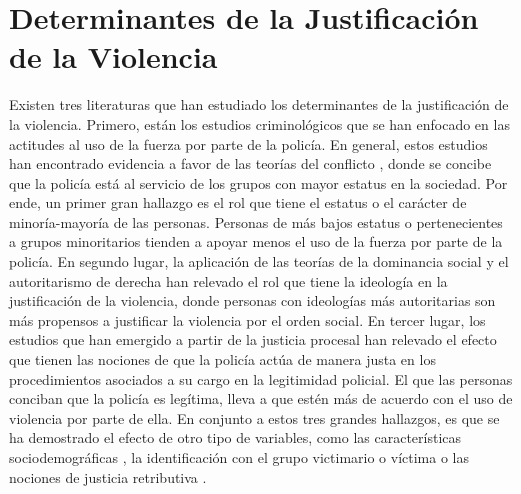 \documentclass[12pt,twoside]{templates/facsothesis}
\begin{document}
\hypertarget{determinantes-de-la-justificaciuxf3n-de-la-violencia}{%
\section{Determinantes de la Justificación de la Violencia}\label{determinantes-de-la-justificaciuxf3n-de-la-violencia}}

Existen tres literaturas que han estudiado los determinantes de la justificación de la violencia. Primero, están los estudios criminológicos que se han enfocado en las actitudes al uso de la fuerza por parte de la policía. En general, estos estudios han encontrado evidencia a favor de las teorías del conflicto \citep{Chambliss1995, Quinney1971, Turk1969}, donde se concibe que la policía está al servicio de los grupos con mayor estatus en la sociedad. Por ende, un primer gran hallazgo es el rol que tiene el estatus o el carácter de minoría-mayoría de las personas. Personas de más bajos estatus o pertenecientes a grupos minoritarios tienden a apoyar menos el uso de la fuerza por parte de la policía. En segundo lugar, la aplicación de las teorías de la dominancia social \citep{Sidanius1999} y el autoritarismo de derecha \citep{Altemeyer1988} han relevado el rol que tiene la ideología en la justificación de la violencia, donde personas con ideologías más autoritarias son más propensos a justificar la violencia por el orden social. En tercer lugar, los estudios que han emergido a partir de la justicia procesal \citep{Tyler2006} han relevado el efecto que tienen las nociones de que la policía actúa de manera justa en los procedimientos asociados a su cargo en la legitimidad policial. El que las personas conciban que la policía es legítima, lleva a que estén más de acuerdo con el uso de violencia por parte de ella. En conjunto a estos tres grandes hallazgos, es que se ha demostrado el efecto de otro tipo de variables, como las características sociodemográficas \citep{Gamson1970, Blumenthal1972, Arthur1994, Thompson2004, Gerber2017}, la identificación con el grupo victimario o víctima \citep{Bradford2017, Gerber2017a} o las nociones de justicia retributiva \citep{Blumenthal1972, Puga2016}.
\end{document}
